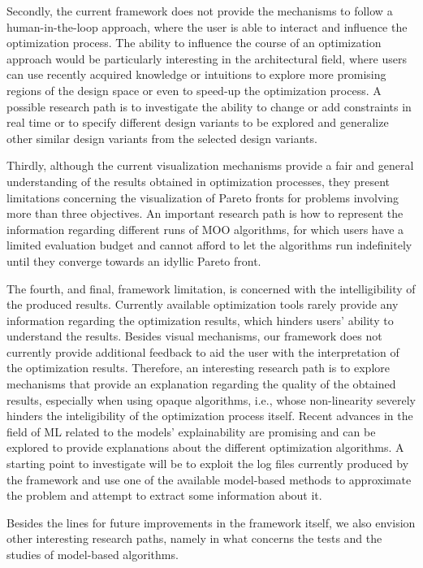 Secondly, the current framework does not provide the mechanisms to follow a human-in-the-loop approach, where the user is able to interact and influence the optimization process. The ability to influence the course of an optimization approach would be particularly interesting in the architectural field, where users can use recently acquired knowledge or intuitions to explore more promising regions of the design space or even to speed-up the optimization process. A possible research path is to investigate the ability to change or add constraints in real time or to specify different design variants to be explored and generalize other similar design variants from the selected design variants.

Thirdly, although the current visualization mechanisms provide a fair and general understanding of the results obtained in optimization processes, they present limitations concerning the visualization of Pareto fronts for problems involving more than three objectives. An important research path is how to represent the information regarding different runs of \ac{MOO} algorithms, for which users have a limited evaluation budget and cannot afford to let the algorithms run indefinitely until they converge towards an idyllic Pareto front. %

The fourth, and final, framework limitation, is concerned with the intelligibility of the produced results. Currently available optimization tools rarely provide any information regarding the optimization results, which hinders users' ability to understand the results. Besides visual mechanisms, our framework does not currently provide additional feedback to aid the user with the interpretation of the optimization results. Therefore, an interesting research path is to explore mechanisms that provide an explanation regarding the quality of the obtained results, especially when using opaque algorithms, i.e., whose non-linearity severely hinders the inteligibility of the optimization process itself. Recent advances in the field of \ac{ML} related to the models' explainability are promising and can be explored to provide explanations about the different optimization algorithms. A starting point to investigate will be to exploit the log files currently produced by the framework and use one of the available model-based methods to approximate the problem and attempt to extract some information about it.

Besides the lines for future improvements in the framework itself, we also envision other interesting research paths, namely in what concerns the tests and the studies of model-based algorithms. 


